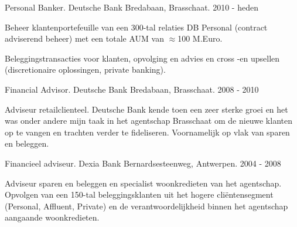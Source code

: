 


\begin{cventries}


\cventry
{Personal Banker.} %
{Deutsche Bank} %
{Bredabaan, Brasschaat.} %
{2010 - heden} %
{ %
\begin{cvitems}
	\item Beheer klantenportefeuille van een 300-tal relaties DB Personal (contract adviserend beheer) met een totale AUM van $\approx$100 M.Euro. 
	\item Beleggingstransacties voor klanten, opvolging en advies en cross -en upsellen (discretionaire oplossingen, private banking).
\end{cvitems}
}

\cventry
{Financial Advisor.} %
{Deutsche Bank} %
{Bredabaan, Brasschaat.} %
{2008 - 2010} %
{ %
	\begin{cvitems}
		\item Adviseur retailclienteel. Deutsche Bank kende toen een zeer sterke groei en het was onder andere mijn taak in het agentschap Brasschaat om de nieuwe klanten op te vangen en trachten verder te fideliseren. Voornamelijk op vlak van sparen en beleggen. 
	\end{cvitems}
}


\cventry
{Financieel adviseur.} %
{Dexia Bank} %
{Bernardsesteenweg, Antwerpen.} %
{2004 - 2008} %
{ %
\begin{cvitems}
\item {Adviseur sparen en beleggen en specialist woonkredieten van het agentschap. Opvolgen
	van een 150-tal beleggingsklanten uit het hogere cliëntensegment (Personal, Affluent, Private) en
	de verantwoordelĳkheid binnen het agentschap aangaande woonkredieten.}
\end{cvitems}
}


\end{cventries}

